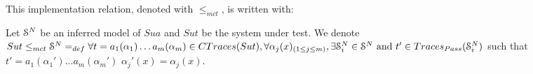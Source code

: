 %
%

This implementation relation, denoted with $\leq_{mct}$, is
written with:

\begin{definition}
	\label{impl21}
	 Let $\EuScript{S}^{N}$ be an inferred model of $\mathit{Sua}$ and
	 $\mathit{Sut}$ be the system under test.
	We denote ${Sut} \leq_{mct} \EuScript{S}^{N} =_{def} \forall t=
	a_1(\alpha_1) \dots a_m(\alpha_m) \in CTraces({Sut}), \forall \alpha_j(x)_{(1 \leq j \leq m)},\\ \exists \EuScript{S}_i^{N} \in \EuScript{S}^{N} \text{ and } t'\in Traces_{Pass}(\EuScript{S}_i^{N})$ such that $t'=a_1(\alpha_1')...a_m(\alpha_m')$  $\alpha_j'(x)=\alpha_j(x)$.
\end{definition}

